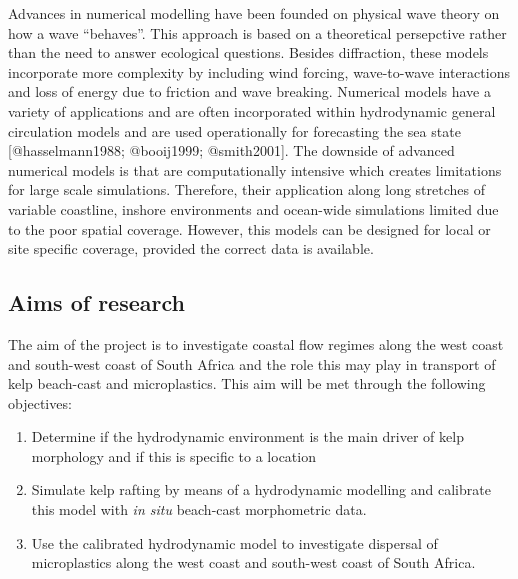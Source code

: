 \documentclass[]{article}
\providecommand{\tightlist}{%
  \setlength{\itemsep}{0pt}\setlength{\parskip}{0pt}}
\begin{document}
Advances in numerical modelling have been founded on physical wave
theory on how a wave ``behaves''. This approach is based on a
theoretical persepctive rather than the need to answer ecological
questions. Besides diffraction, these models incorporate more complexity
by including wind forcing, wave-to-wave interactions and loss of energy
due to friction and wave breaking. Numerical models have a variety of
applications and are often incorporated within hydrodynamic general
circulation models and are used operationally for forecasting the sea
state {[}@hasselmann1988; @booij1999; @smith2001{]}. The downside of
advanced numerical models is that are computationally intensive which
creates limitations for large scale simulations. Therefore, their
application along long stretches of variable coastline, inshore
environments and ocean-wide simulations limited due to the poor spatial
coverage. However, this models can be designed for local or site
specific coverage, provided the correct data is available.

\subsection{Aims of research}\label{aims-of-research}

The aim of the project is to investigate coastal flow regimes along the
west coast and south-west coast of South Africa and the role this may
play in transport of kelp beach-cast and microplastics. This aim will be
met through the following objectives:

\begin{enumerate}
\def\labelenumi{\Alph{enumi})}
\tightlist
\item
  Determine if the hydrodynamic environment is the main driver of kelp
  morphology and if this is specific to a location
\item
  Simulate kelp rafting by means of a hydrodynamic modelling and
  calibrate this model with \emph{in situ} beach-cast morphometric data.
\item
  Use the calibrated hydrodynamic model to investigate dispersal of
  microplastics along the west coast and south-west coast of South
  Africa.
\end{enumerate}
\end{document}
